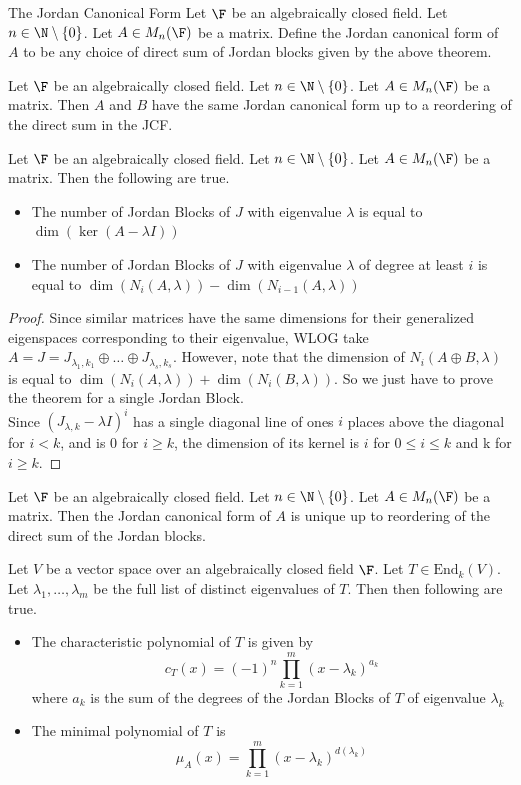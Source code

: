 \documentclass[a4paper]{article}
\begin{document}
\begin{defn}{The Jordan Canonical Form}{} Let $\F$ be an algebraically closed field. Let $n\in\N\setminus\{0\}$. Let $A\in M_n(\F)$ be a matrix. Define the Jordan canonical form of $A$ to be any choice of direct sum of Jordan blocks given by the above theorem. 
\end{defn}

\begin{lmm}{}{} Let $\F$ be an algebraically closed field. Let $n\in\N\setminus\{0\}$. Let $A\in M_n(\F)$ be a matrix. Then $A$ and $B$ have the same Jordan canonical form up to a reordering of the direct sum in the JCF. 
\end{lmm}

\begin{prp}{}{} Let $\F$ be an algebraically closed field. Let $n\in\N\setminus\{0\}$. Let $A\in M_n(\F)$ be a matrix. Then the following are true. 
\begin{itemize}
\item The number of Jordan Blocks of $J$ with eigenvalue $\lambda$ is equal to $\dim(\ker(A-\lambda I))$
\item The number of Jordan Blocks of $J$ with eigenvalue $\lambda$ of degree at least $i$ is equal to $\dim(N_i(A,\lambda))-\dim(N_{i-1}(A,\lambda))$
\end{itemize}\begin{proof} Since similar matrices have the same dimensions for their generalized eigenspaces corresponding to their eigenvalue, WLOG take $A=J=J_{\lambda_1,k_1}\oplus\dots\oplus J_{\lambda_s,k_s}$. However, note that the dimension of $N_i(A\oplus B,\lambda)$ is equal to $\dim(N_i(A,\lambda))+\dim(N_i(B,\lambda))$. So we just have to  prove the theorem for a single Jordan Block. \\
Since $(J_{\lambda,k}-\lambda I)^i$ has a single diagonal line of ones $i$ places above the diagonal for $i<k$, and is $0$ for $i\geq k$, the dimension of its kernel is $i$ for $0\leq i\leq k$ and k for $i\geq k$. 
\end{proof}
\end{prp}

\begin{prp}{}{} Let $\F$ be an algebraically closed field. Let $n\in\N\setminus\{0\}$. Let $A\in M_n(\F)$ be a matrix. Then the Jordan canonical form of $A$ is unique up to reordering of the direct sum of the Jordan blocks. 
\end{prp}

\begin{prp}{}{} Let $V$ be a vector space over an algebraically closed field $\F$. Let $T\in\text{End}_k(V)$. Let $\lambda_1,\dots,\lambda_m$ be the full list of distinct eigenvalues of $T$. Then then following are true. 
\begin{itemize}
\item The characteristic polynomial of $T$ is given by $$c_T(x)=(-1)^n\prod_{k=1}^m(x-\lambda_k)^{a_k}$$ where $a_k$ is the sum of the degrees of the Jordan Blocks of $T$ of eigenvalue $\lambda_k$
\item The minimal polynomial of $T$ is $$\mu_A(x)=\prod_{k=1}^m(x-\lambda_k)^{d(\lambda_k)}$$
\end{itemize}
\end{prp}
\end{document}
